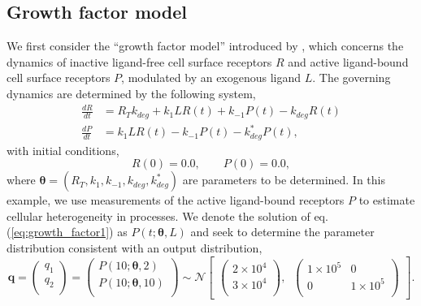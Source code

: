 \subsection{Growth factor model}
We first consider the ``growth factor model'' introduced by \cite{dixit2018maximum}, which concerns the dynamics of inactive ligand-free cell surface receptors $R$ and active ligand-bound cell surface receptors $P$, modulated by an exogenous ligand $L$. The governing dynamics are determined by the following system,
%
\begin{align}\label{eq:growth_factor}
\frac{dR}{dt} &= R_T k_{deg} + k_1 L R(t) + k_{-1} P(t) - k_{deg} R(t)\\
\label{eq:growth_factor1}
\frac{dP}{dt} &= k_1 L R(t) - k_{-1} P(t) - k^*_{deg} P(t),
\end{align}
with initial conditions,
\begin{equation*}
R(0) = 0.0, \qquad P(0) = 0.0,
\end{equation*}
%
where $\boldsymbol{\theta}=(R_T, k_1, k_{-1}, k_{deg}, k^*_{deg})$ are parameters to be determined. In this example, we use measurements of the active ligand-bound receptors $P$ to estimate cellular heterogeneity in processes. We denote the solution of eq. (\ref{eq:growth_factor1}) as $P(t; \boldsymbol{\theta}, L)$ and seek to determine the parameter distribution consistent with an output distribution,
%
\begin{equation}\label{eq:MM_outputDistribution}
\boldsymbol{q} =
\begin{pmatrix}
q_1\\
q_2\\
\end{pmatrix}
=
\begin{pmatrix}
P(10; \boldsymbol{\theta}, 2)\\
P(10; \boldsymbol{\theta}, 10)\\
\end{pmatrix} \sim  \mathcal{N}
\begin{bmatrix}
\begin{pmatrix}
2\times 10^4\\
3\times 10^4\\
\end{pmatrix}, \;\;
\begin{pmatrix}
1\times 10^5 & 0\\
0 & 1\times 10^5\\
\end{pmatrix}
\end{bmatrix}.
\end{equation}
%

